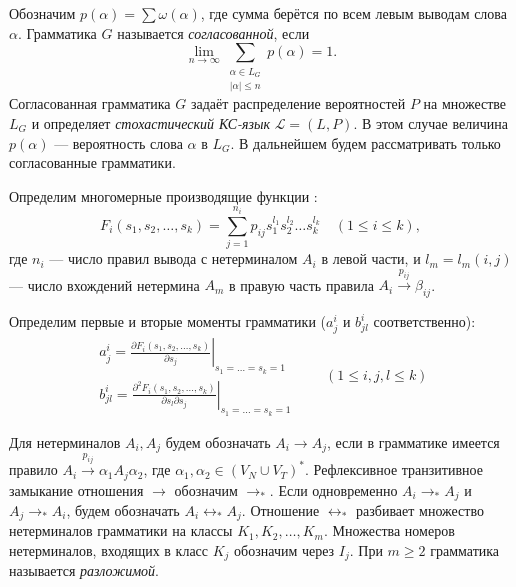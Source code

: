 \documentclass[12pt]{article}
\renewcommand{\leq}{\leqslant}
\renewcommand{\geq}{\geqslant}
\begin{document}
Обозначим $p(\alpha) = \sum \omega(\alpha)$, где сумма берётся по всем левым выводам слова $\alpha$. Грамматика $G$ называется \textit{согласованной}, если
\begin{equation}
	\lim_{n \rightarrow \infty} \sum_{\substack{\alpha \in L_G\\\left|\alpha\right| \leq n}} p(\alpha) = 1.
\end{equation}
Согласованная грамматика $G$ задаёт распределение вероятностей $P$ на множестве $L_G$ и определяет \textit{стохастический КС-язык} $\mathcal{L} = (L, P)$. В этом случае величина $p(\alpha)$ --- вероятность слова $\alpha$ в $L_G$. В дальнейшем будем рассматривать только согласованные грамматики.

Определим многомерные производящие функции \cite{fu-struct}:
\begin{equation}
\label{eq:f-def}
	F_i(s_1, s_2, \ldots, s_k) = \sum_{j = 1}^{n_i} p_{ij} s_1^{l_1} s_2^{l_2} \ldots s_k^{l_k}\quad (1 \leq i \leq k),
\end{equation}
где $n_i$ --- число правил вывода с нетерминалом $A_i$ в левой части, и $l_m = l_m(i,j)$ --- число вхождений нетермина $A_m$ в правую часть правила $A_i \xrightarrow{p_{ij}} \beta_{ij}$.

Определим первые и вторые моменты грамматики ($a^i_j$ и $b^i_{jl}$ соответственно):
\begin{equation}
\label{eq:aij-bij-definition}
	\begin{split}
	a^i_j = \left. \frac{\partial F_i(s_1, s_2, \ldots, s_k)}{\partial s_j} \right|_{s_1 = \ldots = s_k = 1} \\
	b^i_{jl} = \left. \frac{\partial^2 F_i(s_1, s_2, \ldots, s_k)}{\partial s_l \partial s_j} \right|_{s_1 = \ldots = s_k = 1}
	\end{split}
	\qquad (1 \leq i, j, l \leq k)
\end{equation}

Для нетерминалов $A_i, A_j$ будем обозначать $A_i \rightarrow A_j$, если в грамматике имеется правило $A_i \xrightarrow{p_{ij}} \alpha_1 A_j \alpha_2$, где $\alpha_1, \alpha_2 \in (V_N \cup V_T)^*$. Рефлексивное транзитивное замыкание отношения $\rightarrow$ обозначим $\rightarrow_*$. Если одновременно $A_i \rightarrow_* A_j$ и $A_j \rightarrow_* A_i$, будем обозначать $A_i \leftrightarrow_* A_j$. Отношение $\leftrightarrow_*$ разбивает множество нетерминалов грамматики на классы $K_1, K_2, \ldots, K_m$. Множества номеров нетерминалов, входящих в класс $K_j$ обозначим через $I_j$. При $m \geq 2$ грамматика называется \textit{разложимой}.
\end{document}
